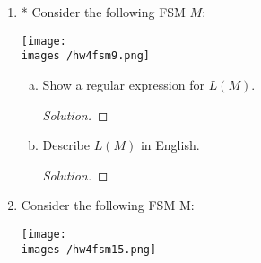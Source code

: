 \documentclass[10pt]{article}
\newcommand{\images}{/home/gparker/classes/341/images}
\begin{document}
\begin{enumerate}[1)]
\begin{enumerate}[a)]
\addtocounter{enumii}{1}
\item
$(a^+a^nb^n)$.
\begin{proof}[Answer] $ $\\
\begin{enumerate}[(i)]
\item
YOUR ANSWER
\item
YOUR ANSWER
\item
YOUR ANSWER
\end{enumerate}
\end{proof}
\begin{proof}
\end{proof}
\addtocounter{enumii}{1}
\item
$(((ab) \cup c)^* \cap (b \cup c^*))$.
\begin{proof}[Answer] $ $\\
\begin{enumerate}[(i)]
\item
YOUR ANSWER
\item
YOUR ANSWER
\item
YOUR ANSWER
\end{enumerate}
\end{proof}
\begin{proof}
\end{proof}
\end{enumerate}

\addtocounter{enumi}{4}

\item
* Consider the following FSM $M$:
\begin{center}
\texttt{[image: \\images /hw4fsm9.png]}
\end{center}

\begin{enumerate}[a)]
\item
Show a regular expression for $L(M)$.
\begin{proof}[Solution]
\end{proof}
\item
Describe $L(M)$ in English.
\begin{proof}[Solution]
\end{proof}
\end{enumerate}

\addtocounter{enumi}{5}
\item
Consider the following FSM M:

\begin{center}
\texttt{[image: \\images /hw4fsm15.png]}
\end{center}


\end{enumerate}
\end{document}

